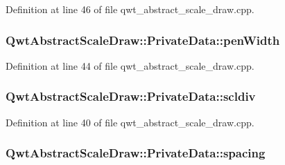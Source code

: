 Definition at line 46 of file qwt\-\_\-abstract\-\_\-scale\-\_\-draw.\-cpp.

\hypertarget{class_qwt_abstract_scale_draw_1_1_private_data_aced095ac3cc6aea1d7d4516b8eba27a7}{
\subsubsection[{pen\-Width}]{ Qwt\-Abstract\-Scale\-Draw\-::\-Private\-Data\-::pen\-Width}}\label{class_qwt_abstract_scale_draw_1_1_private_data_aced095ac3cc6aea1d7d4516b8eba27a7}


Definition at line 44 of file qwt\-\_\-abstract\-\_\-scale\-\_\-draw.\-cpp.

\hypertarget{class_qwt_abstract_scale_draw_1_1_private_data_abbdf0c43780e547a630a5b2ed0d42d6e}{
\subsubsection[{scldiv}]{ Qwt\-Abstract\-Scale\-Draw\-::\-Private\-Data\-::scldiv}}\label{class_qwt_abstract_scale_draw_1_1_private_data_abbdf0c43780e547a630a5b2ed0d42d6e}


Definition at line 40 of file qwt\-\_\-abstract\-\_\-scale\-\_\-draw.\-cpp.

\hypertarget{class_qwt_abstract_scale_draw_1_1_private_data_abd1795e03ded95386afb740f3fb9239a}{
\subsubsection[{spacing}]{ Qwt\-Abstract\-Scale\-Draw\-::\-Private\-Data\-::spacing}}\label{class_qwt_abstract_scale_draw_1_1_private_data_abd1795e03ded95386afb740f3fb9239a}


